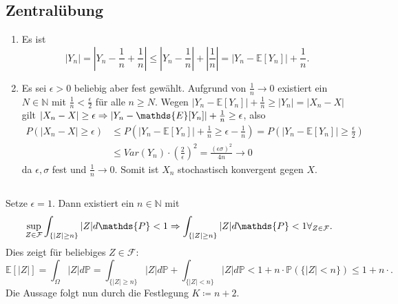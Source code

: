 \documentclass[a4paper]{article}
\begin{document}
\makeexheaderger

\subsection{Zentralübung}

\begin{enumerate}[label=(\alph*)]
    \item Es ist 
    \begin{equation*}
        |Y_n| = \left|Y_n - \frac{1}{n} + \frac{1}{n}\right| \leq \left| Y_n - \frac{1}{n} \right| + \left| \frac{1}{n} \right| = |Y_n - \mathds{E}[Y_n]| + \frac{1}{n}\text{.}
    \end{equation*}
    \item Es sei $\epsilon > 0$ beliebig aber fest gewählt.
    Aufgrund von $\frac{1}{n} \to 0$ existiert ein $N \in \mathds{N}$ mit $\frac{1}{n} < \frac{\epsilon}{2}$ für alle $n \geq N$.
    Wegen $|Y_n - \mathds{E}[Y_n]| + \frac{1}{n} \geq |Y_n| = |X_n - X|$ gilt $|X_n - X| \geq \epsilon \then |Y_n - \mathds{E}[Y_n]| + \frac{1}{n} \geq \epsilon$, also 
    \begin{align*}
        P(|X_n - X| \geq \epsilon) &\leq P(|Y_n - \mathds{E}[Y_n]| + \frac{1}{n} \geq \epsilon - \frac{1}{n}) = P(|Y_n - \mathds{E}[Y_n]| \geq \frac{\epsilon}{2}) \\
        &\leq Var(Y_n) \cdot \left(\frac{2}{\epsilon}\right)^2 = \frac{(\epsilon \sigma)^2}{4n} \to 0
    \end{align*}
    da $\epsilon, \sigma$ fest und $\frac{1}{n} \to 0$.
    Somit ist $X_n$ stochastisch konvergent gegen $X$.
\end{enumerate}

\subsection{}

\subsection{}

Setze $\epsilon = 1$. Dann existiert ein $n \in \mathds{N}$ mit
\begin{equation*}
    \sup_{Z \in \mathcal{F}} \int_{\{|Z| \geq n\}} |Z| d\mathds{P} < 1  \then 
    \int_{\{|Z| \geq n\}} |Z| d\mathds{P} < 1 \forall_{Z \in \mathcal{F}}\text{.}
\end{equation*}
Dies zeigt für beliebiges $Z \in \mathcal{F}$:
\begin{equation*}
    \mathds{E}[|Z|] = \int_\Omega |Z| d\mathds{P} = \int_{\{|Z| \geq n\}} |Z| d\mathds{P} + \int_{\{|Z| < n\}} |Z| d\mathds{P} < 1 + n \cdot \mathds{P}(\{|Z| < n\}) \leq 1 + n \cdot  \text{.}
\end{equation*}
Die Aussage folgt nun durch die Festlegung $K \coloneq n+2$.
\end{document}
